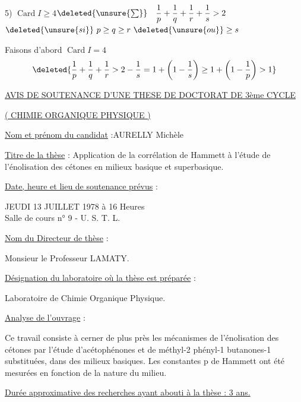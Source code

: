 5) $\operatorname{Card}I\geq4$\qquad $\deleted{\unsure{\sum}}\quad\dfrac1p+\dfrac1q+\dfrac1r+\dfrac1s>2$\qquad $\deleted{\unsure{si}}\ p\geq q\geq r\ \deleted{\unsure{ou}}\geq s$

Faisons d'abord $\operatorname{Card}I=4$
\[
\deleted{\frac1p+\frac1q+\frac1r>2-\frac1s=1+\left(1-\frac1s\right)\geq1+\left(1-\frac1p\right)>1}
\]

\uline{AVIS DE SOUTENANCE D'UNE THESE DE DOCTORAT DE 3ème CYCLE}

\uline{( CHIMIE ORGANIQUE PHYSIQUE )}

\uline{Nom et prénom du candidat} :\qquad AURELLY Michèle

\uline{Titre de la thèse} : Application de la corrélation de Hammett à l'étude de l'énolisation des cétones en milieux basique et superbasique.

\uline{Date, heure et lieu de soutenance prévus} :

JEUDI 13 JUILLET 1978 à 16 Heures\\
Salle de cours n° 9 - U. S. T. L.

\uline{Nom du Directeur de thèse} :

Monsieur le Professeur LAMATY.

\uline{Désignation du laboratoire où la thèse est préparée} :

Laboratoire de Chimie Organique Physique.

\uline{Analyse de l'ouvrage} :

Ce travail consiste à cerner de plus près les mécanismes de l'énolisation des cétones par l'étude d'acétophénones et de méthyl-2 phényl-1 butanones-1 substituées, dans des milieux basiques. Les constantes p de Hammett ont été mesurées en fonction de la nature du milieu.

\uline{Durée approximative des recherches ayant abouti à la thèse : 3 ans.}

